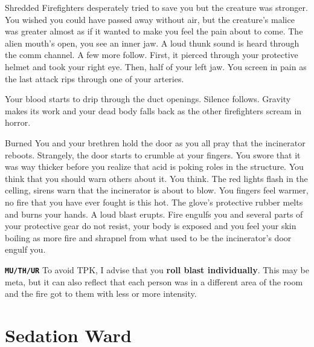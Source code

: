 \begin{rpg-warnbox}{Shredded}
   Firefighters desperately tried to save you but the creature was stronger. You wished you could have passed away without air, but the creature's malice was greater almost as if it wanted to make you feel the pain about to come. The alien mouth's open, you see an inner jaw. A loud thunk sound is heard through the comm channel. A few more follow. First, it pierced through your protective helmet and took your right eye. Then, half of your left jaw. You screen in pain as the last attack rips through one of your arteries.
   
   Your blood starts to drip through the duct openings. Silence follows. Gravity makes its work and your dead body falls back as the other firefighters scream in horror.
\end{rpg-warnbox}



\begin{rpg-warnbox}{Burned}
   You and your brethren hold the door as you all pray that the incinerator reboots. Strangely, the door starts to crumble at your fingers. You swore that it was way thicker before you realize that acid is poking roles in the structure. You think that you should warn others about it. You think. The red lights flash in the celling, sirens warn that the incinerator is about to blow. You fingers feel warmer, no fire that you have ever fought is this hot. The glove's protective rubber melts and burns your hands. A loud blast erupts. Fire engulfs you and several parts of your protective gear do not resist, your body is exposed and you feel your skin boiling as more fire and shrapnel from what used to be the incinerator's door engulf you. 

   \texttt{\textbf{MU/TH/UR}} To avoid TPK, I advise that you \textbf{roll blast individually}. This may be meta, but it can also reflect that each person was in a different area of the room and the fire got to them with less or more intensity.
\end{rpg-warnbox}

\section{Sedation Ward}


